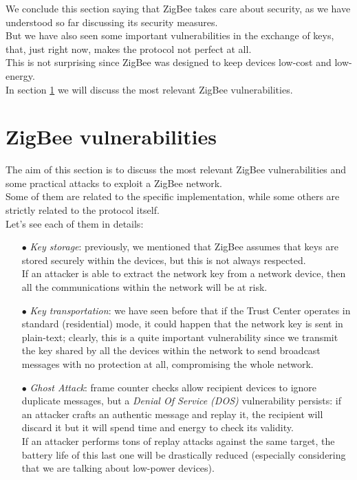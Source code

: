 \documentclass[12pt]{report}
\begin{document}
{\begin{itemize}
\end{itemize}


We conclude this section saying that ZigBee takes care about security, as we have understood so far discussing its security measures.\\
But we have also seen some important vulnerabilities in the exchange of keys, that, just right now, makes the protocol not perfect at all.\\
This is not surprising since ZigBee was designed to keep devices low-cost and low-energy.\\

In section \ref{sec:zigbeevulns} we will discuss the most relevant ZigBee vulnerabilities.


\clearpage
\section{ZigBee vulnerabilities}
\label{sec:zigbeevulns}
\bigskip
The aim of this section is to discuss the most relevant ZigBee vulnerabilities and some practical attacks to exploit a ZigBee network.\\
Some of them are related to the specific implementation, while some others are strictly related to the protocol itself.\\
Let's see each of them in details:

\begin{itemize}
\setlength{\itemindent}{+4mm}
\item[$\bullet$] \emph{Key storage}: previously, we mentioned that ZigBee assumes that keys are stored securely within the devices, but this is not always respected.\\
If an attacker is able to extract the network key from a network device, then all the communications within the network will be at risk.

\item[$\bullet$] \emph{Key transportation}: we have seen before that if the Trust Center operates in standard (residential) mode, it could happen that the network key is sent in plain-text; clearly, this is a quite important vulnerability since we transmit the key shared by all the devices within the network to send broadcast messages with no protection at all, compromising the whole network.

\item[$\bullet$] \emph{Ghost Attack}: frame counter checks allow recipient devices to ignore duplicate messages, but a \emph{Denial Of Service (DOS)} vulnerability persists: if an attacker crafts an authentic message and replay it, the recipient will discard it but it will spend time and energy to check its validity.\\
If an attacker performs tons of replay attacks against the same target, the battery life of this last one will be drastically reduced (especially considering that we are talking about low-power devices).


\end{itemize}}
\end{document}
